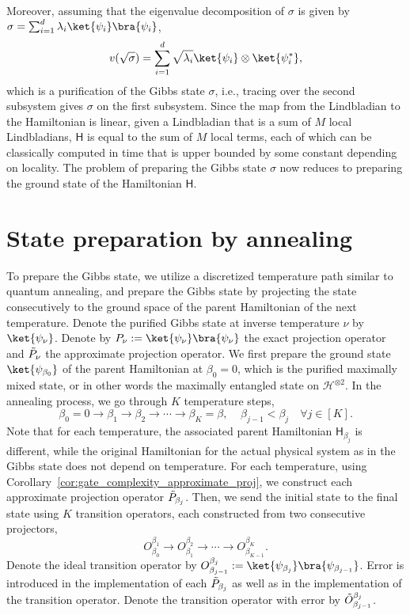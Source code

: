 \documentclass{article}
\theoremstyle{plain}
\theoremstyle{plain}
\theoremstyle{plain}
\theoremstyle{plain}
\theoremstyle{plain}
\theoremstyle{plain}
\theoremstyle{plain}
\newcommand{\sfH}{\ensuremath{\mathsf{H}}}
\newcommand{\calH}{\ensuremath{\mathcal{H}}}
\begin{document}
Moreover, assuming that the eigenvalue decomposition of $\sigma$ is given by $\sigma = \sum_{i=1}^d \lambda_i \ket{\psi_i} \bra{\psi_i}$, 
\begin{equation}
    v(\sqrt{\sigma}) = \sum_{i=1}^d \sqrt{\lambda_i} \ket{\psi_i} \otimes \ket{\psi_i^*},
\end{equation} which is a purification of the Gibbs state $\sigma$, i.e., tracing over the second subsystem gives $\sigma$ on the first subsystem. Since the map from the Lindbladian to the Hamiltonian is linear, given a Lindbladian that is a sum of $M$ local Lindbladians, $\sfH$ is equal to the sum of $M$ local terms, each of which can be classically computed in time that is upper bounded by some constant depending on locality. The problem of preparing the Gibbs state $\sigma$ now reduces to preparing the ground state of the Hamiltonian $\sfH$.

\section{State preparation by annealing}
\label{sec:annealing}


To prepare the Gibbs state, we utilize a discretized temperature path similar to quantum annealing, and prepare the Gibbs state by projecting the state consecutively to the ground space of the parent Hamiltonian of the next temperature. Denote the purified Gibbs state at inverse temperature $\nu$ by $\ket{\psi_{\nu}}$. Denote by $P_{\nu} := \ket{\psi_\nu}\bra{\psi_\nu}$ the exact projection operator and $\Tilde{P}_{\nu}$ the approximate projection operator. We first prepare the ground state $\ket{\psi_{\beta_0}}$ of the parent Hamiltonian at $\beta_0 = 0$, which is the purified maximally mixed state, or in other words the maximally entangled state on $\calH^{\otimes 2}$.
In the annealing process, we go through $K$ temperature steps,
\begin{equation}
    \beta_0 = 0 \rightarrow \beta_1 \rightarrow \beta_2 \rightarrow \cdots \rightarrow \beta_K = \beta, \;\;\;\; \beta_{j-1} < \beta_{j} \quad \forall j\in[K].
\end{equation} 
Note that for each temperature, the associated parent Hamiltonian $\sfH_{\beta_j}$ is different, while the original Hamiltonian for the actual physical system as in the Gibbs state does not depend on temperature. 
For each temperature, using Corollary~\ref{cor:gate_complexity_approximate_proj}, we construct each approximate projection operator $\Tilde{P}_{\beta_j}$. 
Then, we send the initial state to the final state using $K$ transition operators, each constructed from two consecutive projectors,
\begin{equation}
    \label{eq:transitionops}
    O_{\beta_0}^{\beta_{1}} \rightarrow O_{\beta_1}^{\beta_2} \rightarrow \cdots \rightarrow O_{\beta_{K-1}}^{\beta_{K}}.
\end{equation} 
Denote the ideal transition operator by $O_{\beta_{j-1}}^{\beta_{j}} := \ket{\psi_{\beta_{j}}} \bra{\psi_{\beta_{j-1}}}$.
Error is introduced in the implementation of each $\Tilde{P}_{\beta_j}$ as well as in the implementation of the transition operator. Denote the transition operator with error by $\Tilde{O}_{\beta_{j-1}}^{\beta_{j}}$.
\end{document}
